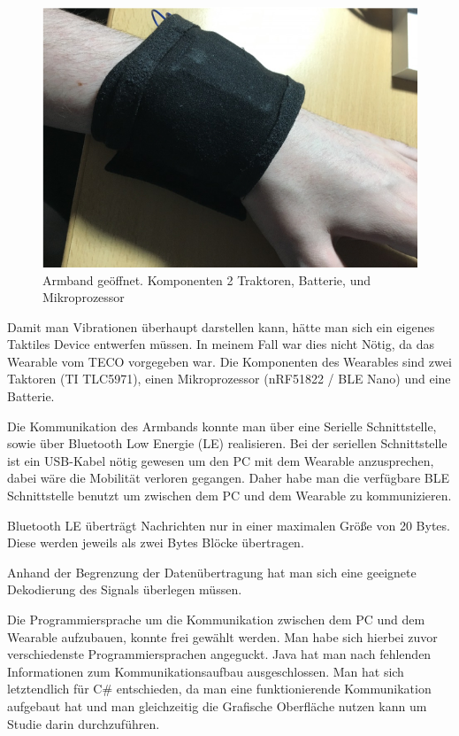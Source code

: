 \begin{figure}
	\centering
    \includegraphics[width=\textwidth]{pics/wristband2.png}
    \caption{Armband ge{\"o}ffnet. Komponenten 2 Traktoren, Batterie, und Mikroprozessor}
    \label{fig:wristband2}
\end{figure}

Damit man Vibrationen {\"u}berhaupt darstellen kann, h{\"a}tte man sich ein eigenes Taktiles Device entwerfen m{\"u}ssen. In meinem Fall war dies nicht N{\"o}tig, da das Wearable vom TECO vorgegeben war. Die Komponenten des Wearables sind zwei Taktoren (TI TLC5971), einen Mikroprozessor (nRF51822 / BLE Nano) und eine Batterie.
 
Die Kommunikation des Armbands konnte man {\"u}ber eine Serielle Schnittstelle, sowie {\"u}ber Bluetooth Low Energie (LE) realisieren.
Bei der seriellen Schnittstelle ist ein USB-Kabel n{\"o}tig gewesen um den PC  mit dem Wearable anzusprechen, dabei w{\"a}re die Mobilit{\"a}t verloren gegangen. Daher habe man die verf{\"u}gbare BLE Schnittstelle benutzt um zwischen dem PC und dem Wearable zu kommunizieren. 

Bluetooth LE {\"u}bertr{\"a}gt Nachrichten nur in einer maximalen Gr{\"o}{\ss}e von 20 Bytes. Diese werden jeweils als zwei Bytes Bl{\"o}cke {\"u}bertragen. 

Anhand der Begrenzung der Daten{\"u}bertragung hat man sich eine geeignete Dekodierung des Signals {\"u}berlegen m{\"u}ssen. 

Die Programmiersprache um die Kommunikation zwischen dem PC und dem Wearable aufzubauen, konnte frei gew{\"a}hlt werden. Man habe sich hierbei zuvor verschiedenste Programmiersprachen angeguckt. Java hat man nach fehlenden Informationen zum Kommunikationsaufbau ausgeschlossen. Man hat sich letztendlich f{\"u}r C\# entschieden, da man eine funktionierende Kommunikation aufgebaut hat und man gleichzeitig die Grafische Oberfl{\"a}che nutzen kann um Studie darin durchzuf{\"u}hren. 

